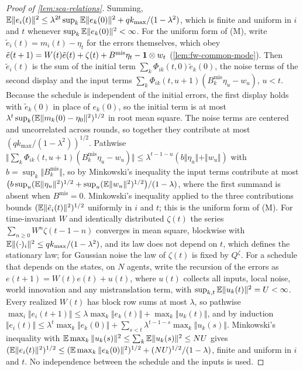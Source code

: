 \begin{proof}[Proof of \cref{lem:sca-relations}]
Summing, $\mathbb{E}\Vert e_i(t)\Vert^2\le\lambda^{2t}\sup_k\mathbb{E}\Vert e_k(0)\Vert^2+qk_{\max}/(1-\lambda^2)$, which is finite and uniform in $i$ and $t$ whenever $\sup_k\mathbb{E}\Vert e_k(0)\Vert^2<\infty$. For the uniform form of \textup{(M)}, write $\tilde e_i(t)=m_i(t)-\eta_t$ for the errors themselves, which obey $\tilde e(t+1)=W(t)\tilde e(t)+\zeta(t)+B^{\mathrm{mis}}\eta_t-\mathbf{1}\otimes w_t$ (\cref{lem:fw-common-mode}). Then $\tilde e_i(t)$ is the sum of the initial term $\sum_k\Phi_{ik}(t,0)\tilde e_k(0)$, the noise terms of the second display and the input terms $\sum_k\Phi_{ik}(t,u+1)(B^{\mathrm{mis}}_k\eta_u-w_u)$, $u<t$. Because the schedule is independent of the initial errors, the first display holds with $\tilde e_k(0)$ in place of $e_k(0)$, so the initial term is at most $\lambda^t\sup_k(\mathbb{E}\Vert m_k(0)-\eta_0\Vert^2)^{1/2}$ in root mean square. The noise terms are centered and uncorrelated across rounds, so together they contribute at most $(qk_{\max}/(1-\lambda^2))^{1/2}$. Pathwise $\Vert\sum_k\Phi_{ik}(t,u+1)(B^{\mathrm{mis}}_k\eta_u-w_u)\Vert\le\lambda^{t-1-u}(b\Vert\eta_u\Vert+\Vert w_u\Vert)$ with $b=\sup_k\Vert B^{\mathrm{mis}}_k\Vert$, so by Minkowski's inequality the input terms contribute at most $\bigl(b\sup_u(\mathbb{E}\Vert\eta_u\Vert^2)^{1/2}+\sup_u(\mathbb{E}\Vert w_u\Vert^2)^{1/2}\bigr)/(1-\lambda)$, where the first summand is absent when $B^{\mathrm{mis}}=0$. Minkowski's inequality applied to the three contributions bounds $(\mathbb{E}\Vert\tilde e_i(t)\Vert^2)^{1/2}$ uniformly in $i$ and $t$; this is the uniform form of \textup{(M)}. For time-invariant $W$ and identically distributed $\zeta(t)$ the series $\sum_{n\ge0}W^n\zeta(t-1-n)$ converges in mean square, blockwise with $\mathbb{E}\Vert(\cdot)_i\Vert^2\le qk_{\max}/(1-\lambda^2)$, and its law does not depend on $t$, which defines the stationary law; for Gaussian noise the law of $\zeta(t)$ is fixed by $Q^\zeta$. For a schedule that depends on the states, on $N$ agents, write the recursion of the errors as $e(t+1)=W(t)e(t)+u(t)$, where $u(t)$ collects all inputs, local noise, world innovation and any mistranslation term, with $\sup_{k,t}\mathbb{E}\Vert u_k(t)\Vert^2=U<\infty$. Every realized $W(t)$ has block row sums at most $\lambda$, so pathwise $\max_i\Vert e_i(t+1)\Vert\le\lambda\max_k\Vert e_k(t)\Vert+\max_k\Vert u_k(t)\Vert$, and by induction $\Vert e_i(t)\Vert\le\lambda^t\max_k\Vert e_k(0)\Vert+\sum_{s<t}\lambda^{t-1-s}\max_k\Vert u_k(s)\Vert$. Minkowski's inequality with $\mathbb{E}\max_k\Vert u_k(s)\Vert^2\le\sum_k\mathbb{E}\Vert u_k(s)\Vert^2\le NU$ gives $(\mathbb{E}\Vert e_i(t)\Vert^2)^{1/2}\le(\mathbb{E}\max_k\Vert e_k(0)\Vert^2)^{1/2}+(NU)^{1/2}/(1-\lambda)$, finite and uniform in $i$ and $t$. No independence between the schedule and the inputs is used.


\end{proof}
